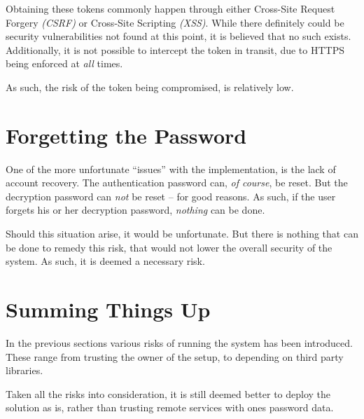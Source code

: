		Obtaining these tokens commonly happen through either Cross-Site Request Forgery \emph{(CSRF)} or Cross-Site Scripting \emph{(XSS)}. While there definitely could be security vulnerabilities not found at this point, it is believed that no such exists. Additionally, it is not possible to intercept the token in transit, due to HTTPS being enforced at \emph{all} times.

		As such, the risk of the token being compromised, is relatively low.



	\section{Forgetting the Password}
		One of the more unfortunate ``issues'' with the implementation, is the lack of account recovery. The authentication password can, \emph{of course}, be reset. But the decryption password can \emph{not} be reset -- for good reasons. As such, if the user forgets his or her decryption password, \emph{nothing} can be done.

		Should this situation arise, it would be unfortunate. But there is nothing that can be done to remedy this risk, that would not lower the overall security of the system. As such, it is deemed a necessary risk.

	\section{Summing Things Up}
		In the previous sections various risks of running the system has been introduced. These range from trusting the owner of the setup, to depending on third party libraries.




		Taken all the risks into consideration, it is still deemed better to deploy the solution as is, rather than trusting remote services with ones password data.
